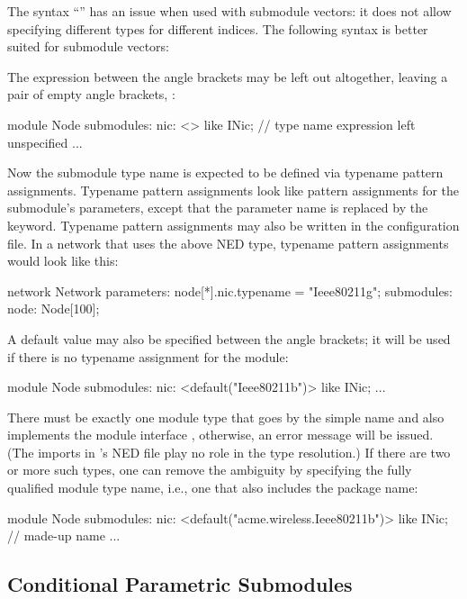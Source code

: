 The syntax ``'' has an issue when used with submodule
vectors: it does not allow specifying different types for different indices. The
following syntax is better suited for submodule vectors:

The expression between the angle brackets may be left out altogether, leaving a
pair of empty angle brackets, \ttt{<>}:

\begin{ned}
module Node
{
    submodules:
        nic: <> like INic;  // type name expression left unspecified
        ...
}
\end{ned}

Now the submodule type name is expected to be defined via typename pattern
assignments. Typename pattern assignments look like pattern assignments for the
submodule's parameters, except that the parameter name is replaced by the
 keyword. Typename pattern assignments may also be written in
the configuration file. In a network that uses the above  NED type,
typename pattern assignments would look like this:

\begin{ned}
network Network
{
    parameters:
        node[*].nic.typename = "Ieee80211g";
    submodules:
        node: Node[100];
}
\end{ned}

A default value may also be specified between the angle brackets; it will be
used if there is no typename assignment for the module:

\begin{ned}
module Node
{
    submodules:
        nic: <default("Ieee80211b")> like INic;
        ...
}
\end{ned}

There must be exactly one module type that goes by the simple name
 and also implements the module interface , otherwise,
an error message will be issued. (The imports in 's NED file play no
role in the type resolution.) If there are two or more such types, one can
remove the ambiguity by specifying the fully qualified module type name, i.e.,
one that also includes the package name:

\begin{ned}
module Node
{
    submodules:
        nic: <default("acme.wireless.Ieee80211b")> like INic; // made-up name
        ...
}
\end{ned}

\subsection{Conditional Parametric Submodules}
\label{sec:ned-lang:conditional-parametric-submodules}

